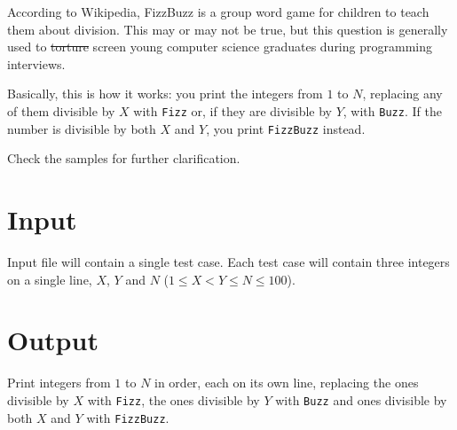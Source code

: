 
\noindent
According to Wikipedia, FizzBuzz is a group word game for children to teach them about division.
This may or may not be true, but this question is generally used to \sout{torture} screen young computer science graduates during programming interviews.

Basically, this is how it works:
you print the integers from $1$ to $N$, replacing any of them divisible by $X$ with \texttt{Fizz} or, if they are divisible by $Y$, with \texttt{Buzz}.
If the number is divisible by both $X$ and $Y$, you print \texttt{FizzBuzz} instead.

Check the samples for further clarification.

\section*{Input}
Input file will contain a single test case. Each test case will contain three integers on a single line, $X$, $Y$ and $N$ ($1 \leq X < Y \leq N \leq 100$).

\section*{Output}
Print integers from $1$ to $N$ in order, each on its own line, replacing the ones divisible by $X$ with \texttt{Fizz}, the ones divisible by $Y$ with \texttt{Buzz} and ones divisible by both $X$ and $Y$ with \texttt{FizzBuzz}.
